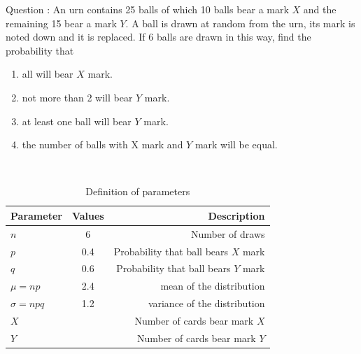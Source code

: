 \documentclass[journal,12pt,twocolumn]{IEEEtran}
\theoremstyle{remark}
\begin{document}
\let\vec\mathbf




\vspace{3cm}



\bigskip

\renewcommand{\thefigure}{\theenumi}
\renewcommand{\thetable}{\theenumi}
Question : An urn contains 25 balls of which 10 balls bear a mark $X$ and the remaining 15 bear a mark $Y$. A ball is drawn at random from the urn, its mark is noted down and it is replaced. If 6 balls are drawn in this way, find the probability that\\
\begin{enumerate}[label=(\alph*)]
\item all will bear $X$ mark.\\
\item not more than 2 will bear $Y$ mark.\\
\item at least one ball will bear $Y$ mark.\\
\item the number of balls with X mark and $Y$ mark will be equal.\\
\end{enumerate}
\solution  \\
\fi
\begin{table}[!ht]
\centering
\begin{tabular}{|l|c|r|}
    \hline
    Parameter & Values & Description\\
    \hline
    $n$ & 6 & Number of draws\\
    \hline
    $p$ & 0.4 & Probability that ball bears $X$ mark \\
    \hline
    $q$ & 0.6 & Probability that ball bears $Y$ mark \\
    \hline
    $\mu=np$ & 2.4 & mean of the distribution \\
    \hline
    $\sigma=npq $ & 1.2 & variance of the distribution\\
    \hline
    $X$ &  & Number of cards bear mark $X$ \\
    \hline
    $Y$ &  & Number of cards bear mark $Y$ \\
    \hline
\end{tabular}
\caption{Definition of parameters}
\label{tab:gaussian/9/3/17}
\end{table}
\end{document}

